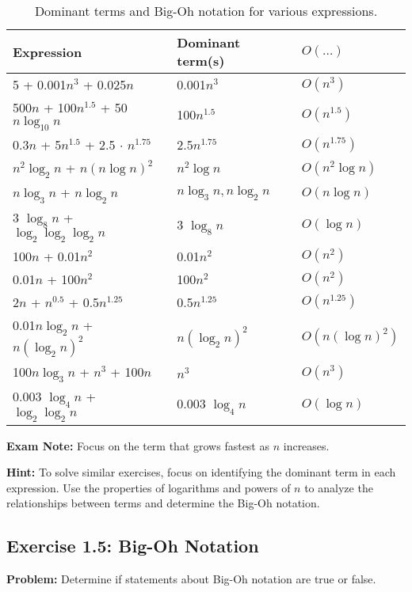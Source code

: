 \begin{table}[h]
    \centering
    \small
    \begin{tabularx}{\linewidth}{|X|X|X|}
        \hline
        Expression & Dominant term(s) & $O(\ldots)$ \\
        \hline
        5 + 0.001$n^3$ + 0.025$n$ & 0.001$n^3$ & $O(n^3)$ \\
        \hline
        500$n$ + 100$n^{1.5}$ + 50$n \log_{10} n$ & 100$n^{1.5}$ & $O(n^{1.5})$ \\
        \hline
        0.3$n$ + 5$n^{1.5}$ + 2.5 $\cdot$ $n^{1.75}$ & 2.5$n^{1.75}$ & $O(n^{1.75})$ \\
        \hline
        $n^2 \log_2 n$ + $n(n \log n)^2$ & $n^2 \log n$ & $O(n^2 \log n)$ \\
        \hline
        $n \log_3 n$ + $n \log_2 n$ & $n \log_3 n, n \log_2 n$ & $O(n \log n)$ \\
        \hline
        3 $\log_8 n$ + $\log_2 \log_2 \log_2 n$ & 3 $\log_8 n$ & $O(\log n)$ \\
        \hline
        100$n$ + 0.01$n^2$ & 0.01$n^2$ & $O(n^2)$ \\
        \hline
        0.01$n$ + 100$n^2$ & 100$n^2$ & $O(n^2)$ \\
        \hline
        2$n$ + $n^{0.5}$ + 0.5$n^{1.25}$ & 0.5$n^{1.25}$ & $O(n^{1.25})$ \\
        \hline
        0.01$n \log_2 n$ + $n(\log_2 n)^2$ & $n(\log_2 n)^2$ & $O(n(\log n)^2)$ \\
        \hline
        100$n \log_3 n$ + $n^3$ + 100$n$ & $n^3$ & $O(n^3)$ \\
        \hline
        0.003 $\log_4 n$ + $\log_2 \log_2 n$ & 0.003 $\log_4 n$ & $O(\log n)$ \\
        \hline
    \end{tabularx}
    \caption{Dominant terms and Big-Oh notation for various expressions.}
\end{table}

\textbf{Exam Note:} Focus on the term that grows fastest as $n$ increases.

\textbf{Hint:} To solve similar exercises, focus on identifying the dominant term in each expression. Use the properties of logarithms and powers of $n$ to analyze the relationships between terms and determine the Big-Oh notation.

\subsection{Exercise 1.5: Big-Oh Notation}
\textbf{Problem:} Determine if statements about Big-Oh notation are true or false.

